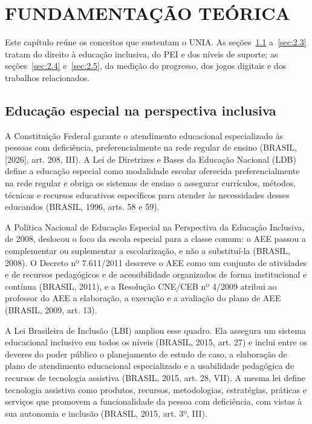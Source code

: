 
\chapter{FUNDAMENTAÇÃO TEÓRICA}\label{cap:2}

Este capítulo reúne os conceitos que sustentam o UNIA. As seções~\ref{sec:2.1} a~\ref{sec:2.3} tratam do direito à educação inclusiva, do PEI e dos níveis de suporte; as seções~\ref{sec:2.4} e~\ref{sec:2.5}, da medição do progresso, dos jogos digitais e dos trabalhos relacionados.

\section{Educação especial na perspectiva inclusiva}\label{sec:2.1}

A Constituição Federal garante o atendimento educacional especializado às pessoas com deficiência, preferencialmente na rede regular de ensino (BRASIL, [2026], art. 208, III). A Lei de Diretrizes e Bases da Educação Nacional (LDB) define a educação especial como modalidade escolar oferecida preferencialmente na rede regular e obriga os sistemas de ensino a assegurar currículos, métodos, técnicas e recursos educativos específicos para atender às necessidades desses educandos (BRASIL, 1996, arts. 58 e 59).

A Política Nacional de Educação Especial na Perspectiva da Educação Inclusiva, de 2008, deslocou o foco da escola especial para a classe comum: o AEE passou a complementar ou suplementar a escolarização, e não a substituí-la (BRASIL, 2008). O Decreto nº 7.611/2011 descreve o AEE como um conjunto de atividades e de recursos pedagógicos e de acessibilidade organizados de forma institucional e contínua (BRASIL, 2011), e a Resolução CNE/CEB nº 4/2009 atribui ao professor do AEE a elaboração, a execução e a avaliação do plano de AEE (BRASIL, 2009, art. 13).

A Lei Brasileira de Inclusão (LBI) ampliou esse quadro. Ela assegura um sistema educacional inclusivo em todos os níveis (BRASIL, 2015, art. 27) e inclui entre os deveres do poder público o planejamento de estudo de caso, a elaboração de plano de atendimento educacional especializado e a usabilidade pedagógica de recursos de tecnologia assistiva (BRASIL, 2015, art. 28, VII). A mesma lei define tecnologia assistiva como produtos, recursos, metodologias, estratégias, práticas e serviços que promovem a funcionalidade da pessoa com deficiência, com vistas à sua autonomia e inclusão (BRASIL, 2015, art. 3º, III).

